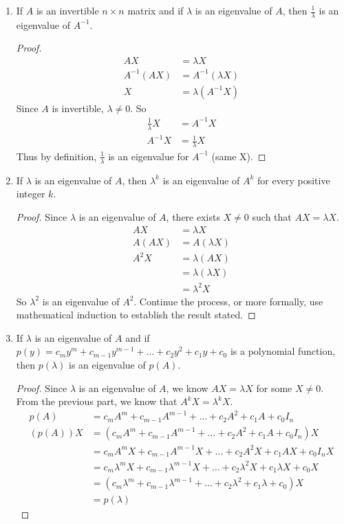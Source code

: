 \documentclass[12pt]{article}
\begin{document}
\begin{enumerate}
\begin{enumerate}
\begin{proof}
\end{proof} Note: Eigenspaces are not altered. 
\item If $A$ is an invertible $n \times n$ matrix and if $\lambda$ is an eigenvalue of $A$, then $\frac{1}{\lambda}$ is an eigenvalue of $A^{-1}$. \begin{proof} $$ \begin{aligned} AX &= \lambda X \\ A^{-1}(AX) &= A^{-1}(\lambda X) \\ X &= \lambda(A^{-1}X) \end{aligned} $$ Since $A$ is invertible, $\lambda \neq 0 $. So $$\begin{aligned} \frac{1}{\lambda}X &= A^{-1}X \\ A^{-1}X &= \frac{1}{\lambda}X \end{aligned} $$ Thus by definition, $\frac{1}{\lambda}$ is an eigenvalue for $A^{-1}$ (same X). \end{proof} 
\item If $\lambda$ is an eigenvalue of $A$, then $\lambda^k$ is an eigenvalue of $A^k$ for every positive integer $k$. \begin{proof} Since $\lambda$ is an eigenvalue of $A$, there exists $X \neq 0$ such that $AX = \lambda X$. $$\begin{aligned} AX &= \lambda X \\ A(AX) &= A(\lambda X) \\ A^2X &= \lambda(AX) \\ &= \lambda(\lambda X) \\ &= \lambda^2X \end{aligned} $$ So $\lambda^2$ is an eigenvalue of $A^2$. Continue the process, or more formally, use mathematical induction to establish the result stated. \end{proof} 
\item If $\lambda$ is an eigenvalue of $A$ and if $p(y) = c_my^m + c_{m - 1}y^{m - 1} + \dots + c_2y^2 + c_1y + c_0$ is a polynomial function, then $p(\lambda)$ is an eigenvalue of $p(A)$. \begin{proof} Since $\lambda$ is an eigenvalue of $A$, we know $AX = \lambda X$ for some $X \neq 0$. From the previous part, we know that $A^kX = \lambda^kX$. $$\begin{aligned} p(A) &= c_mA^m + c_{m - 1}A^{m - 1} + \dots + c_2A^2 + c_1A + c_0I_n \\ (p(A))X &= (c_mA^m + c_{m - 1}A^{m - 1} + \dots + c_2A^2 + c_1A + c_0I_n)X \\ &= c_mA^mX + c_{m - 1}A^{m - 1}X + \dots + c_2A^2X + c_1AX + c_0I_nX \\ &= c_m\lambda^mX + c_{m - 1}\lambda^{m - 1}X + \dots + c_2\lambda^2X + c_1\lambda X + c_0X \\ &= (c_m\lambda^m + c_{m - 1}\lambda^{m - 1} + \dots + c_2\lambda^2 + c_1\lambda + c_0)X \\ &= p(\lambda) \end{aligned} $$ \end{proof}

\end{enumerate}
\end{enumerate}
\end{document}
